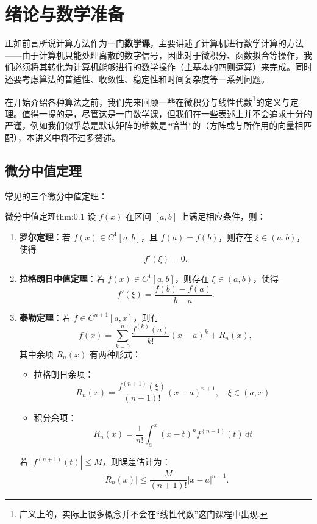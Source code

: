 \chapter*{绪论与数学准备}

正如前言所说计算方法作为一门{\bf 数学课}，主要讲述了计算机进行数学计算的方法——由于计算机只能处理离散的数字信号，因此对于微积分、函数拟合等操作，我们必须将其转化为计算机能够进行的数学操作（主基本的四则运算）来完成。同时还要考虑算法的普适性、收敛性、稳定性和时间复杂度等一系列问题。

在开始介绍各种算法之前，我们先来回顾一些在微积分与线性代数\footnote{广义上的，实际上很多概念并不会在“线性代数”这门课程中出现.}的定义与定理。值得一提的是，尽管这是一门数学课，但我们在一些表述上并不会追求十分的严谨，例如我们似乎总是默认矩阵的维数是“恰当”的（方阵或与所作用的向量相匹配），本讲义中将不过多赘述。

\section{微分中值定理}
常见的三个微分中值定理：
\begin{theorem}{微分中值定理}{thm:0.1}
设 $f(x)$ 在区间 $[a,b]$ 上满足相应条件，则：
\begin{enumerate}
    \item \textbf{罗尔定理}：若 $f(x) \in C^1[a,b]$，且 $f(a) = f(b)$，则存在 $\xi \in (a,b)$，使得
    \[
        f'(\xi) = 0.
    \]

    \item \textbf{拉格朗日中值定理}：若 $f(x) \in C^1[a,b]$，则存在 $\xi \in (a,b)$，使得
    \[
        f'(\xi) = \frac{f(b) - f(a)}{b - a}.
    \]

    \item \textbf{泰勒定理}：若 $f \in C^{n+1}[a,x]$，则有
    \[
        f(x) = \sum_{k=0}^{n} \frac{f^{(k)}(a)}{k!}(x - a)^k + R_n(x),
    \]
    其中余项 $R_n(x)$ 有两种形式：

    \begin{itemize}
        \item 拉格朗日余项：
        \[
            R_n(x) = \frac{f^{(n+1)}(\xi)}{(n+1)!}(x - a)^{n+1}, \quad \xi \in (a,x)
        \]
        
        \item 积分余项：
        \[
            R_n(x) = \frac{1}{n!} \int_a^x (x - t)^n f^{(n+1)}(t) \, dt
        \]
    \end{itemize}

    若 $|f^{(n+1)}(t)| \leqslant M$，则误差估计为：
    \[
        |R_n(x)| \leqslant \frac{M}{(n+1)!} |x - a|^{n+1}.
    \]
\end{enumerate}
\end{theorem}


